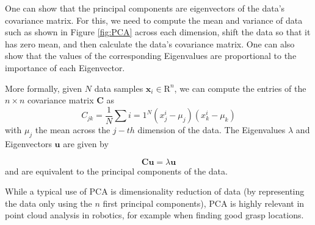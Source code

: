 One can show that the principal components are eigenvectors of the data's covariance matrix. For this, we need to compute the mean and variance of data such as shown in Figure \ref{fig:PCA} across each dimension, shift the data so that it has zero mean, and then calculate the data's covariance matrix. One can also show that the values of the corresponding Eigenvalues are proportional to the importance of each Eigenvector.

More formally, given $N$ data samples $\mathbf{x}_i \in \mathrm{R}^n$, we can compute the entries of the $n \times n$ covariance matrix $\mathbf{C}$ as
\begin{equation}
C_{jk}=\frac{1}{N}\sum{i=1}^N(x_j^i-\mu_j)(x_k^i-\mu_k)
\end{equation}
with $\mu_j$ the mean across the $j-th$ dimension of the data. The Eigenvalues $\lambda$ and Eigenvectors $\mathbf{u}$ are given by

\begin{equation}
\mathbf{C}\mathbf{u}=\lambda \mathbf{u}
\end{equation}
and are equivalent to the principal components of the data. 

While a typical use of PCA is dimensionality reduction of data (by representing the data only using the $n$ first principal components), PCA is highly relevant in point cloud analysis in robotics, for example when finding good grasp locations.  




